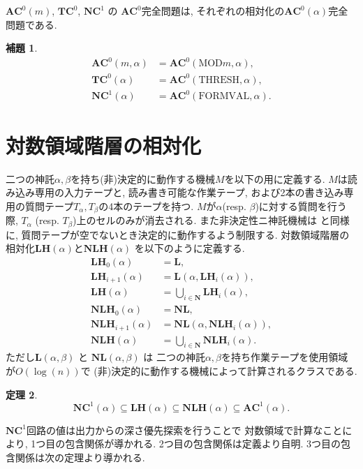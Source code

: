 \documentclass[10pt,a4paper,twocolumn]{jarticle}
\theoremstyle{definition}
\newtheorem{theorem}{定理}%
\newtheorem{lemma}[theorem]{補題}
\theoremstyle{remark}
\newcommand{\N}{\mathbf N}
\newcommand{\classfont}{\mathbf}
\newcommand{\AC}{\classfont{AC}}
\newcommand{\TC}{\classfont{TC}}
\newcommand{\NC}{\classfont{NC}}
\renewcommand{\L}{\classfont{L}}
\newcommand{\NL}{\classfont{NL}}
\newcommand{\LH}{\classfont{LH}}
\newcommand{\NLH}{\classfont{NLH}}
\newcommand{\probfont}{\text}
\newcommand{\MOD}{\probfont{MOD}}
\newcommand{\THRESH}{\probfont{THRESH}}
\newcommand{\FORMVAL}{\probfont{FORMVAL}}
\begin{document}
$\AC^0(m)$, $\TC^0$, $\NC^1$ の $\AC^0$完全問題は, 
それぞれの相対化の$\AC^0(\alpha)$完全問題である.
\begin{lemma}
\begin{align*}
 \AC^0(m, \alpha) &= \AC^0(\MOD m, \alpha),
 \\
 \TC^0(\alpha) &= \AC^0(\THRESH, \alpha),
 \\
 \NC^1(\alpha) &= \AC^0(\FORMVAL, \alpha).
\end{align*} 
\end{lemma}


\section{対数領域階層の相対化}
\label{subsection: two query tapes}
\newcommand{\qqueryalpha}{q_{\text{query}}^\alpha}
\newcommand{\qquerybeta}{q_{\text{query}}^\beta}
\newcommand{\qyes}{q_{\text{yes}}}
\newcommand{\qno}{q_{\text{no}}}
\newcommand{\qacc}{q_{\text{accept}}}


二つの神託$\alpha, \beta$を持ち(非)決定的に動作する機械$M$を以下の用に定義する.
$M$は読み込み専用の入力テープと, 読み書き可能な作業テープ, 
および2本の書き込み専用の質問テープ$T_\alpha, T_\beta$の4本のテープを持つ.
$M$が$\alpha$(resp. $\beta$)に対する質問を行う際, 
$T_\alpha$ (resp. $T_\beta$)上のセルのみが消去される.
また非決定性ニ神託機械は \cite{ruzzo1984space} と同様に,
質問テープが空でないとき決定的に動作するよう制限する.
対数領域階層の相対化$\LH(\alpha)$と$\NLH(\alpha)$
を以下のように定義する.
\begin{align*}
 \LH_0(\alpha) &= \L,
\\
 \LH_{i+1}(\alpha) &= \L(\alpha, \LH_i(\alpha)), 
\\
 \LH(\alpha) &= \bigcup_{i \in \N} \LH_i(\alpha),
\\
 \NLH_0(\alpha) &= \NL,
\\
 \NLH_{i+1}(\alpha) &= \NL(\alpha, \NLH_i(\alpha)), 
\\
 \NLH(\alpha) &= \bigcup_{i \in \N} \NLH_i(\alpha).
\end{align*}
ただし$\L(\alpha, \beta)$ と $\NL(\alpha, \beta)$ は
二つの神託$\alpha, \beta$を持ち作業テープを使用領域が$O(\log(n))$で
(非)決定的に動作する機械によって計算されるクラスである.

\begin{theorem}
\begin{equation*}
 \NC^1(\alpha) 
 \subseteq \LH(\alpha)
 \subseteq \NLH(\alpha)
 \subseteq \AC^1(\alpha).
\end{equation*}
\end{theorem}
$\NC^1$回路の値は出力からの深さ優先探索を行うことで
対数領域で計算なことにより, 1つ目の包含関係が導かれる.
2つ目の包含関係は定義より自明.
3つ目の包含関係は次の定理より導かれる.
\end{document}
